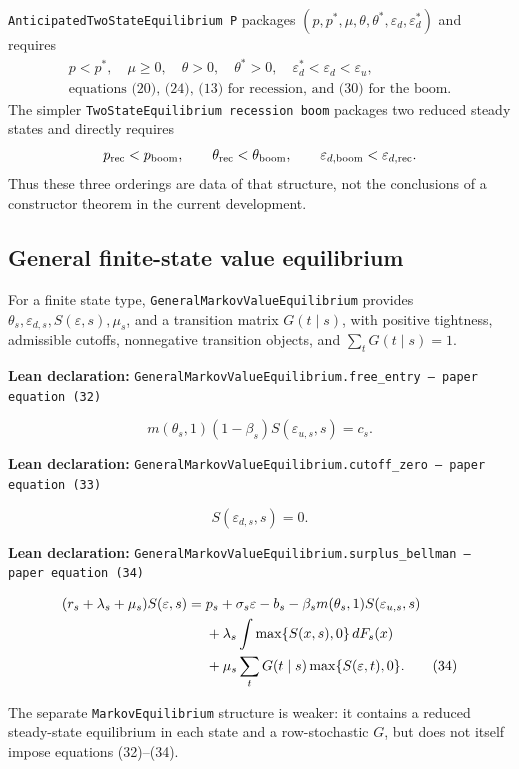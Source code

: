 \documentclass[11pt]{article}
\newcommand{\code}[1]{\texttt{#1}}
\newcommand{\epsd}{\varepsilon_d}
\newcommand{\epsu}{\varepsilon_u}
\newcommand{\mworker}[1]{m(#1,1)}
\newcommand{\decl}[1]{\par\smallskip\noindent\colorbox{softblue}{\parbox{0.965\linewidth}{\textbf{Lean declaration:} \code{#1}}}\par\smallskip}
\begin{document}
\code{AnticipatedTwoStateEquilibrium P} packages $(p,p^*,\mu,\theta,\theta^*,
\epsd,\epsd^*)$ and requires
\begin{gather*}
p<p^*,\quad \mu\ge0,\quad \theta>0,\quad\theta^*>0,
\quad \epsd^*<\epsd<\epsu,\\
\text{equations (20), (24), (13) for recession, and (30) for the boom.}
\end{gather*}
The simpler \code{TwoStateEquilibrium recession boom} packages two reduced steady
states and directly requires
\begin{equation*}
p_{\rm rec}<p_{\rm boom},\qquad
\theta_{\rm rec}<\theta_{\rm boom},\qquad
\varepsilon_{d,{\rm boom}}<\varepsilon_{d,{\rm rec}}.
\end{equation*}
Thus these three orderings are data of that structure, not the conclusions of a
constructor theorem in the current development.

\subsection{General finite-state value equilibrium}

For a finite state type, \code{GeneralMarkovValueEquilibrium} provides
$\theta_s,\varepsilon_{d,s},S(\varepsilon,s),\mu_s$, and a transition matrix $G(t\mid s)$,
with positive tightness, admissible cutoffs, nonnegative transition objects, and
$\sum_tG(t\mid s)=1$.

\decl{GeneralMarkovValueEquilibrium.free\_entry --- paper equation (32)}
\begin{equation}
\mworker{\theta_s}(1-\beta_s)S(\varepsilon_{u,s},s)=c_s. \tag{32}
\end{equation}

\decl{GeneralMarkovValueEquilibrium.cutoff\_zero --- paper equation (33)}
\begin{equation}
S(\varepsilon_{d,s},s)=0. \tag{33}
\end{equation}

\decl{GeneralMarkovValueEquilibrium.surplus\_bellman --- paper equation (34)}
\begin{align}
(r_s+\lambda_s+\mu_s)S(\varepsilon,s)
={}&p_s+\sigma_s\varepsilon-b_s
-\beta_s\mworker{\theta_s}S(\varepsilon_{u,s},s) \notag\\
&+\lambda_s\int\max\{S(x,s),0\}\,dF_s(x) \notag\\
&+\mu_s\sum_tG(t\mid s)\max\{S(\varepsilon,t),0\}. \tag{34}
\end{align}

The separate \code{MarkovEquilibrium} structure is weaker: it contains a reduced
steady-state equilibrium in each state and a row-stochastic $G$, but does not itself
impose equations (32)--(34).
\end{document}
